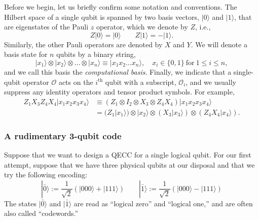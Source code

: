 \documentclass[a4paper,11pt]{article}
\newcommand{\ket}[1]{|#1\rangle}
\newcommand{\Oh}{{\mathcal{O}}}
\begin{document}
Before we begin, let us briefly confirm some notation and conventions.
The Hilbert space of a single qubit is spanned by two basis vectors, $\ket{0}$ and $\ket{1}$, that are eigenstates of the Pauli $z$ operator, which we denote by $Z$, i.e.,
\begin{equation}
Z\ket{0} = \ket{0} \qquad Z\ket{1} = -\ket{1}.
\end{equation}
Similarly, the other Pauli operators are denoted by $X$ and $Y$.
We will denote a basis state for $n$ qubits by a binary string,
\begin{equation}
\ket{x_1} \otimes \ket{x_2} \otimes \dots \otimes \ket{x_n} \equiv \ket{x_1 x_2 \dots x_n}, \quad x_i \in \{0,1\} ~\text{for}~ 1\leq i \leq n,
\end{equation}
and we call this basis the \emph{computational basis}.
Finally, we indicate that a single-qubit operator $\Oh$ acts on the $i^\text{th}$ qubit with a subscript, $\Oh_i$, and we usually suppress any identity operators and tensor product symbols.
For example,
\begin{align*}
Z_1 X_3 Z_4X_4 \ket{x_1 x_2 x_3 x_4} &\equiv (Z_1 \otimes I_2 \otimes X_3 \otimes Z_4 X_4) \ket{x_1 x_2 x_3 x_4} \\
&= (Z_1 \ket{x_1}) \otimes \ket{x_2} \otimes (X_3 \ket{x_3}) \otimes (Z_4 X_4 \ket{x_4}).
\end{align*}


\subsubsection{A rudimentary 3-qubit code}

Suppose that we want to design a QECC for a single logical qubit.
For our first attempt, suppose that we have three physical qubits at our disposal and that we try the following encoding:
\begin{equation} \label{eq:3codewords}
\ket{\bar{0}} := \frac{1}{\sqrt{2}} (\ket{000} + \ket{111}) \qquad \ket{\bar{1}} := \frac{1}{\sqrt{2}} (\ket{000} - \ket{111})
\end{equation}
The states $\ket{\bar{0}}$ and $\ket{\bar{1}}$ are read as ``logical zero'' and ``logical one,'' and are often also called ``codewords.''
\end{document}
